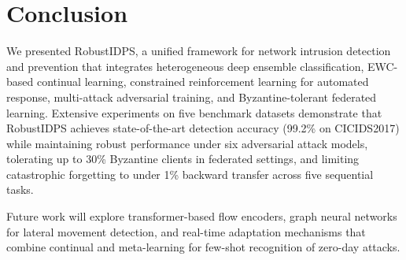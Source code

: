 \documentclass[journal,twoside]{IEEEtran}
\begin{document}
\section{Conclusion}
\label{sec:conclusion}

We presented RobustIDPS, a unified framework for network intrusion detection and prevention that integrates heterogeneous deep ensemble classification, EWC-based continual learning, constrained reinforcement learning for automated response, multi-attack adversarial training, and Byzantine-tolerant federated learning. Extensive experiments on five benchmark datasets demonstrate that RobustIDPS achieves state-of-the-art detection accuracy (99.2\% on CICIDS2017) while maintaining robust performance under six adversarial attack models, tolerating up to 30\% Byzantine clients in federated settings, and limiting catastrophic forgetting to under 1\% backward transfer across five sequential tasks.

Future work will explore transformer-based flow encoders, graph neural networks for lateral movement detection, and real-time adaptation mechanisms that combine continual and meta-learning for few-shot recognition of zero-day attacks.

\balance
\end{document}
